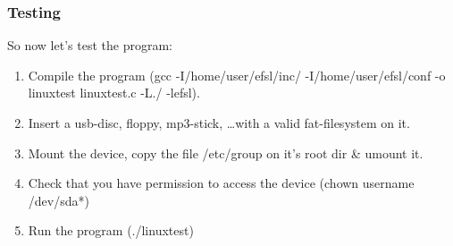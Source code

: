 \subsubsection{Testing}
So now let's test the program:
\begin{enumerate}
	\item{Compile the program 
		(gcc -I/home/user/efsl/inc/ -I/home/user/efsl/conf -o linuxtest 
		linuxtest.c -L./ -lefsl).}
	\item{Insert a usb-disc, floppy, mp3-stick, \ldots with a valid 
		fat-filesystem on it.}
	\item{Mount the device, copy the file /etc/group on it's root dir \& umount
		it.}
	\item{Check that you have permission to access the device
		(chown username /dev/sda*)}
	\item{Run the program (./linuxtest)}
\end{enumerate}











